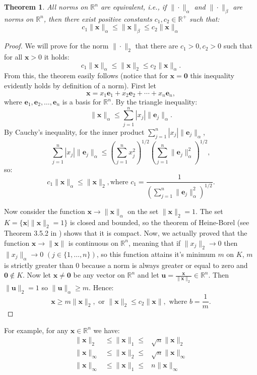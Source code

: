 \documentclass[a4paper,11pt]{report}
\newtheorem{theorem}{Theorem}[section]
\newcommand{\R}{{\mathbb R}}
\begin{document}
\begin{theorem}\label{equivalencenorms}
  All norms on $\R^n$ are \emph{equivalent}, i.e., if $\|\cdot\|_\alpha$ and 
  $\|\cdot\|_\beta$ are norms on $\R^n$, then there exist positive constants $c_1, c_2 \in 
  \R^+$ such that:
  $$c_1 \|\mathbf{x}\|_\alpha \leq \|\mathbf{x}\|_\beta \leq c_2 
  \|\mathbf{x}\|_\alpha$$
  
  \end{theorem}
\begin{proof}
 We will prove for the norm $\|\cdot\|_2$ that there are $c_1>0, c_2>0$ such that 
 for all $\mathbf{x}>0$ it holds:
 $$c_1\|\mathbf{x}\|_\alpha \leq \|\mathbf{x}\|_2 \leq c_2 \|\mathbf{x}\|_\alpha.$$
 From this, the theorem easily follows (notice that for $\mathbf{x} = \mathbf{0}$ this inequality evidently holds by definition of a norm). First let
  $$\mathbf{x} = x_1\mathbf{e}_1 +x_2\mathbf{e}_2 + \cdots + x_n\mathbf{e}_n,$$
  where ${\mathbf{e}_1, \mathbf{e}_2, \ldots, \mathbf{e}_n}$ is a basis for 
  $\R^n$. By the triangle inequality:
  $$\|\mathbf{x}\|_\alpha \leq \sum^n_{j=1} |x_j|\|\mathbf{e}_j\|_\alpha.$$
  By Cauchy's inequality, for the inner product $\sum^n_{j=1} 
  |x_j|\|\mathbf{e}_j\|_\alpha$,
$$\sum^n_{j=1} |x_j|\|\mathbf{e}_j\|_\alpha \leq \left(\sum^n_{j=1} x^2_j\right)^{1/2}\left(\sum^n_{j=1} \|\mathbf{e}_j\|_\alpha^2\right)^{1/2},$$
  so:
  $$c_1\|\mathbf{x}\|_\alpha \leq \|\mathbf{x}\|_2, \text {where } c_1 = \frac{1}{\left(\sum^n_{j=1} \|\mathbf{e}_j\|_\alpha^2\right)^{1/2}}.$$
   
   Now consider the function $\mathbf{x} \to \|\mathbf{x}\|_\alpha$ on the set 
   $\|\mathbf{x}\|_2=1$. The set $K = \{\mathbf{x} \mid \|\mathbf{x}\|_2 = 1\}$ 
   is closed and bounded, so the theorem of Heine-Borel (see Theorem 3.5.2 in \cite{caenepeel}) 
   shows that it is compact. Now, we actually proved that the function $\mathbf{x} \to \|\mathbf{x}\|$ 
   is continuous on $\R^n$, meaning that if $\|x_j\|_2 \to 0$ then $\|x_j\|_\alpha \to 0$ 
   $(j \in \{1,\ldots,n\})$, so this function attains it's minimum $m$ on $K$, $m$ is strictly greater than $0$ 
   because a norm is always greater or equal to zero and $\mathbf{0} \not\in K$. 
   Now let $\mathbf{x} \not = \mathbf{0}$ be any vector on $\R^n$ and let $\mathbf{u} = 
   \frac{\mathbf{x}}{\|\mathbf{x}\|_2} \in \R^n$. Then $\|\mathbf{u}\|_2 = 1$ so 
   $\|\mathbf{u}\|_\alpha \geq m$. Hence:
   $$\mathbf{x} \geq m\|\mathbf{x}\|_2, \text{ or } \|\mathbf{x}\|_2 \leq c_2 
   \|\mathbf{x}\|, \text{ where } b=\frac{1}{m}.$$

\end{proof}
For example, for any $\mathbf{x} \in \R^n$ we have:
\begin{eqnarray*}
  \|\mathbf{x}\|_2 &\leq \|\mathbf{x}\|_1 \leq& \sqrt{n}\|\mathbf{x}\|_2\\
   \|\mathbf{x}\|_\infty &\leq \|\mathbf{x}\|_2 \leq& \sqrt{n}\|\mathbf{x}\|_\infty\\
     \|\mathbf{x}\|_\infty &\leq \|\mathbf{x}\|_1 \leq& n\|\mathbf{x}\|_\infty
  \end{eqnarray*}
\end{document}
